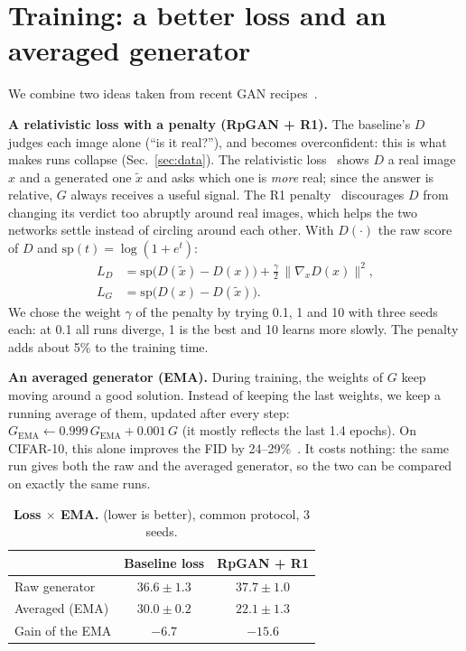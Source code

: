 \section{Training: a better loss and an averaged generator}\label{sec:training}

We combine two ideas taken from recent GAN recipes~\cite{huang2024}.

\textbf{A relativistic loss with a penalty (RpGAN + R1).} The baseline's $D$ judges each image alone (``is it real?''),
and becomes overconfident: this is what makes runs collapse (Sec.~\ref{sec:data}). The relativistic loss~\cite{jolicoeur2019}
shows $D$ a real image $x$ and a generated one $\tilde x$ and asks which one is \emph{more} real; since the answer is
relative, $G$ always receives a useful signal. The R1 penalty~\cite{mescheder2018} discourages $D$ from changing its
verdict too abruptly around real images, which helps the two networks settle instead of circling around each other.
With $D(\cdot)$ the raw score of $D$ and $\mathrm{sp}(t)=\log(1+e^t)$:
\begin{align*}
L_D &= \mathrm{sp}\big(D(\tilde x)-D(x)\big) + \tfrac{\gamma}{2}\,\|\nabla_x D(x)\|^2,\\
L_G &= \mathrm{sp}\big(D(x)-D(\tilde x)\big).
\end{align*}
We chose the weight $\gamma$ of the penalty by trying 0.1, 1 and 10 with three seeds each: at 0.1 all runs diverge, 1 is
the best and 10 learns more slowly. The penalty adds about 5\% to the training time.

\textbf{An averaged generator (EMA).} During training, the weights of $G$ keep moving around a good solution. Instead of
keeping the last weights, we keep a running average of them, updated after every step:
$G_\mathrm{EMA}\leftarrow 0.999\,G_\mathrm{EMA}+0.001\,G$ (it mostly reflects the last 1.4 epochs). On CIFAR-10, this
alone improves the FID by 24--29\%~\cite{yazici2019}. It costs nothing: the same run gives both the raw and the averaged
generator, so the two can be compared on exactly the same runs.

\begin{table}[t]
\centering\small
\setlength{\tabcolsep}{6pt}
\caption{\textbf{Loss $\times$ EMA.} \finc{} (lower is better), common protocol, 3 seeds.}
\label{tab:training}
\begin{tabular}{@{}lcc@{}}
\toprule
 & Baseline loss & RpGAN + R1 \\
\midrule
Raw generator      & $36.6\pm1.3$ & $37.7\pm1.0$ \\
Averaged (EMA)     & $30.0\pm0.2$ & $\mathbf{22.1\pm1.3}$ \\
\midrule
Gain of the EMA    & $-6.7$ & $-15.6$ \\
\bottomrule
\end{tabular}
\end{table}

